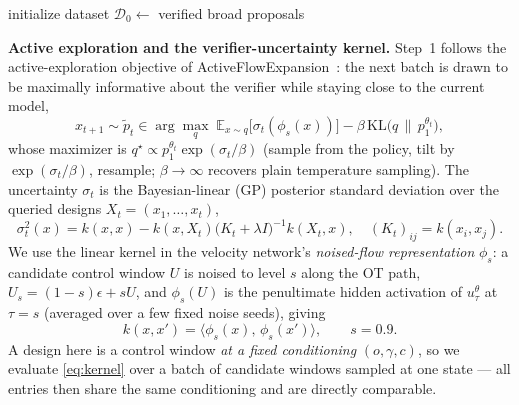 \documentclass[letterpaper, 10 pt, conference]{ieeeconf}
\begin{document}
\begin{algorithm}[H]
\caption{Safe Flow Expansion}\label{alg:sfe}
\BlankLine
initialize dataset $\mathcal D_0 \leftarrow$ verified broad proposals 
\BlankLine
{}
\end{algorithm}

\noindent\textbf{Active exploration and the verifier-uncertainty kernel.}
Step~1 follows the active-exploration objective of ActiveFlowExpansion~\cite{activeflowexpansion}: the next batch is drawn to be maximally informative about the verifier while staying close to the current model,
\begin{equation}
x_{t+1}\sim\tilde p_t\in\arg\max_{q}\;\mathbb E_{x\sim q}\!\big[\sigma_t(\phi_s(x))\big]-\beta\,\mathrm{KL}\!\big(q\,\|\,p^{\theta_t}_1\big),
\label{eq:afe9}
\end{equation}
whose maximizer is $q^\star\propto p^{\theta_t}_1\exp(\sigma_t/\beta)$ (sample from the policy, tilt by $\exp(\sigma_t/\beta)$, resample; $\beta\!\to\!\infty$ recovers plain temperature sampling). The uncertainty $\sigma_t$ is the Bayesian-linear (GP) posterior standard deviation over the queried designs $X_t=(x_1,\dots,x_t)$,
\begin{equation}
\sigma_t^2(x)=k(x,x)-k(x,X_t)\big(K_t+\lambda I\big)^{-1}k(X_t,x),\quad (K_t)_{ij}=k(x_i,x_j).
\label{eq:afe10}
\end{equation}
We use the linear kernel in the velocity network's \emph{noised-flow representation} $\phi_s$: a candidate control window $U$ is noised to level $s$ along the OT path, $U_s=(1-s)\epsilon+sU$, and $\phi_s(U)$ is the penultimate hidden activation of $u^\theta_\tau$ at $\tau{=}s$ (averaged over a few fixed noise seeds), giving
\begin{equation}
k(x,x')=\big\langle\phi_s(x),\,\phi_s(x')\big\rangle,\qquad s=0.9.
\label{eq:kernel}
\end{equation}
A design here is a control window \emph{at a fixed conditioning} $(o,\gamma,c)$, so we evaluate \eqref{eq:kernel} over a batch of candidate windows sampled at one state --- all entries then share the same conditioning and are directly comparable.
\end{document}
